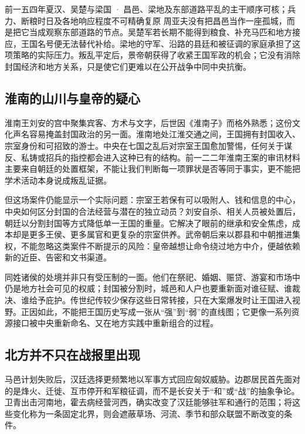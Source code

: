 \begin{event}{}{前一五四年夏}{汉、吴楚与梁国 · 昌邑、梁地及东部道路}{平乱的主干顺序可核；兵力、断粮时日及各地响应程度不可精确复原}
周亚夫没有把昌邑当作一座孤城，而是把它当成观察东部道路的节点。吴楚军若长期不能得到粮食、补充马匹和地方接应，王国名号便无法替代补给。梁地的守军、沿路的县廷和被征调的家庭承担了这项策略的实际压力。叛乱平定后，景帝朝获得了收紧王国军政的机会；它没有消除封国经济和地方关系，只是使它们更难以在公开战争中同中央抗衡。
\end{event}

\subsection{淮南的山川与皇帝的疑心}

淮南王刘安的宫中聚集宾客、方术与文字，后世因《淮南子》而格外熟悉；这份文化声名容易掩盖封国政治的另一面。淮南地处江淮交通之间，王国拥有封国收入、宗室身份和可招致的游士。中央在七国之乱后对宗室王国愈加警惕，任何关于谋反、私铸或招兵的指控都会进入这种已有的结构。前一二二年淮南王案的审讯材料主要来自朝廷的处置框架，不能让我们判断每一项罪状是否等同于事实，更不能把学术活动本身说成叛乱证据。

但这场案件仍能显示一个实际问题：宗室王若保有可以吸附人、钱和信息的中心，中央如何区分封国的合法经营与潜在的独立动员？刘安自杀、相关人员被处置后，朝廷以分割封国等方式降低单一王国的重量。它解决了眼前的继承和安全焦虑，成本却是更多王侯、更多属官和更复杂的宗室供养。武帝朝后来以郡县和中朝推进集权，不能忽略这类案件不断提示的风险：皇帝越想让命令绕过地方中介，便越依赖新的近臣、告密和文书渠道。

同姓诸侯的处境并非只有受压制的一面。他们在祭祀、婚姻、赈贷、游宴和市场中仍是地方社会可见的权威；封国被分割时，城邑和人户也要重新面对谁征赋、谁裁决、谁给予庇护。传世纪传较少保存这些日常转接，只在大案爆发时让王国进入视野。正因如此，不能把王国历史写成一张从“强”到“弱”的直线图；它更像一系列资源接口被中央重新命名、又在地方实践中重新组合的过程。

\subsection{北方并不只在战报里出现}

马邑计划失败后，汉廷选择更频繁地以军事方式回应匈奴威胁。边郡居民首先面对的是烽火、迁徙、互市停开和军粮征调，而不是长安关于“和”或“战”的抽象争论。卫青出击河南地，霍去病经营河西，确实改变了汉廷能够驻军和通行的范围；将这些变化称为一条固定北界，则会遮蔽草场、河流、季节和部众联盟不断改变的条件。

